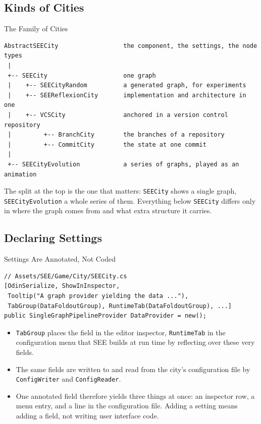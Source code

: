 \subsection{Kinds of Cities}

\begin{frame}[fragile]{The Family of Cities}
  \begin{lstlisting}[basicstyle=\scriptsize\ttfamily]
AbstractSEECity                  the component, the settings, the node types
 |
 +-- SEECity                     one graph
 |    +-- SEECityRandom          a generated graph, for experiments
 |    +-- SEEReflexionCity       implementation and architecture in one
 |    +-- VCSCity                anchored in a version control repository
 |         +-- BranchCity        the branches of a repository
 |         +-- CommitCity        the state at one commit
 |
 +-- SEECityEvolution            a series of graphs, played as an animation
  \end{lstlisting}
  \vspace{1ex}

  The split at the top is the one that matters: \texttt{SEECity} shows a
  single graph, \texttt{SEECityEvolution} a whole series of them. Everything
  below \texttt{SEECity} differs only in where the graph comes from and what
  extra structure it carries.
\end{frame}

\subsection{Declaring Settings}

\begin{frame}[fragile]{Settings Are Annotated, Not Coded}
  \begin{lstlisting}[basicstyle=\scriptsize\ttfamily]
// Assets/SEE/Game/City/SEECity.cs
[OdinSerialize, ShowInInspector,
 Tooltip("A graph provider yielding the data ..."),
 TabGroup(DataFoldoutGroup), RuntimeTab(DataFoldoutGroup), ...]
public SingleGraphPipelineProvider DataProvider = new();
  \end{lstlisting}
  \vspace{1ex}

  \begin{itemize}
    \item \texttt{TabGroup} places the field in the editor inspector,
      \texttt{RuntimeTab} in the configuration menu that SEE builds at run
      time by reflecting over these very fields.
    \item The same fields are written to and read from the city's
      configuration file by \texttt{ConfigWriter} and \texttt{ConfigReader}.
    \item One annotated field therefore yields three things at once: an
      inspector row, a menu entry, and a line in the configuration file. Adding
      a setting means adding a field, not writing user interface code.
  \end{itemize}
\end{frame}

